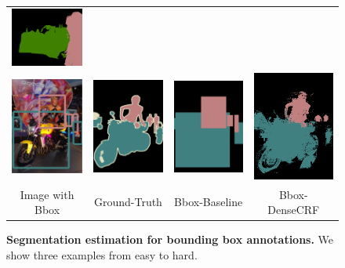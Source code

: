 \begin{figure}
\begin{tabular}{c c c c}
    \includegraphics[width=0.21\linewidth]{fig/erode_bbox/crf/2009_000219.png} \\        \includegraphics[width=0.21\linewidth]{fig/erode_bbox/img/2009_002382.jpg} & 
    \includegraphics[width=0.21\linewidth]{fig/erode_bbox/gt/2009_002382.png} & 
    \includegraphics[width=0.21\linewidth]{fig/erode_bbox/bbox/2009_002382.png} & 
    \includegraphics[width=0.21\linewidth]{fig/erode_bbox/crf/2009_002382.png} \\    
    {\scriptsize Image with Bbox} & {\scriptsize Ground-Truth} & {\scriptsize Bbox-Baseline} & {\scriptsize Bbox-DenseCRF}
  \end{tabular}
  \caption{{\bf Segmentation estimation for bounding box annotations.} We show three examples from easy to hard.}
  \label{fig:bbox_illustration}
\end{figure}

